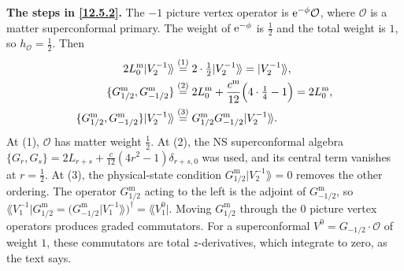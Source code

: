 \begin{tcolorbox}[breakable]
	\begin{remark}
		\textbf{The steps in \eqref{12.5.2}.} The $-1$ picture vertex operator is $\mathrm{e}^{-\phi}\mathcal O$, where $\mathcal O$ is a matter superconformal primary. The weight of $\mathrm{e}^{-\phi}$ is $\frac12$ and the total weight is $1$, so $h_{\mathcal O}=\frac12$. Then
		\begin{align*}
			2L_{0}^{\mathrm m}\lvert V_{2}^{-1}\rangle\!\rangle&\overset{(1)}{=} 2\cdot\tfrac12\lvert V_{2}^{-1}\rangle\!\rangle=\lvert V_{2}^{-1}\rangle\!\rangle ,\\
			\{G_{1/2}^{\mathrm m},G_{-1/2}^{\mathrm m}\}&\overset{(2)}{=} 2L_{0}^{\mathrm m}+\frac{c^{\mathrm m}}{12}\Bigl(4\cdot\tfrac14-1\Bigr)=2L_{0}^{\mathrm m} ,\\
			\{G_{1/2}^{\mathrm m},G_{-1/2}^{\mathrm m}\}\lvert V_{2}^{-1}\rangle\!\rangle&\overset{(3)}{=} G_{1/2}^{\mathrm m}G_{-1/2}^{\mathrm m}\lvert V_{2}^{-1}\rangle\!\rangle .
		\end{align*}
		At (1), $\mathcal O$ has matter weight $\frac12$. At (2), the NS superconformal algebra $\{G_{r},G_{s}\}=2L_{r+s}+\frac{c}{12}(4r^{2}-1)\delta_{r+s,0}$ was used, and its central term vanishes at $r=\frac12$. At (3), the physical-state condition $G_{1/2}^{\mathrm m}\lvert V_{2}^{-1}\rAngle=0$ removes the other ordering. The operator $G_{1/2}^{\mathrm m}$ acting to the left is the adjoint of $G_{-1/2}^{\mathrm m}$, so $\lAngle V_{1}^{-1}\rvert G_{1/2}^{\mathrm m}=\bigl(G_{-1/2}^{\mathrm m}\lvert V_{1}^{-1}\rAngle\bigr)^{\dagger}=\lAngle V_{1}^{0}\rvert$. Moving $G_{1/2}^{\mathrm m}$ through the $0$ picture vertex operators produces graded commutators. For a superconformal $V^{0}=G_{-1/2}\cdot\mathcal O$ of weight $1$, these commutators are total $z$-derivatives, which integrate to zero, as the text says.
	\end{remark}
\end{tcolorbox}

